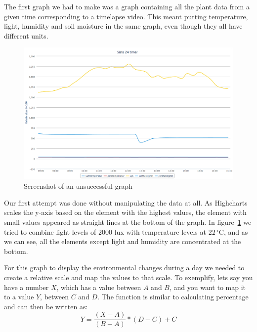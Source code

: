 The first graph we had to make was a graph containing all the plant data from a given time corresponding to a timelapse video. This meant putting temperature, light, humidity and soil moisture in the same graph, even though they all have different units. 



\begin{figure}
\centering
\includegraphics[width=1\textwidth]{img/interface/badgraph.png}
\caption{Screenshot of an unsuccessful graph}
\label{fig:badgraph}
\end{figure}

Our first attempt was done without manipulating the data at all. As Highcharts scales the y-axis based on the element with the highest values, the element with small values appeared as straight lines at the bottom of the graph. In figure~\ref{fig:badgraph} we tried to combine light levels of 2000 lux with temperature levels at $22\,^{\circ}\mathrm{C}$, and as we can see, all the elements except light and humidity are concentrated at the bottom. 

For this graph to display the environmental changes during a day we needed to create a relative scale and map the values to that scale. To exemplify, lets say you have a number \ensuremath{X}, which has a value between \ensuremath{A} and \ensuremath{B}, and you want to map it to a value \ensuremath{Y}, between \ensuremath{C} and \ensuremath{D}. The function is similar to calculating percentage and can then be written as: 
\begin{equation}
Y = \frac{(X-A)}{(B-A)} * (D-C) + C
\end{equation}


